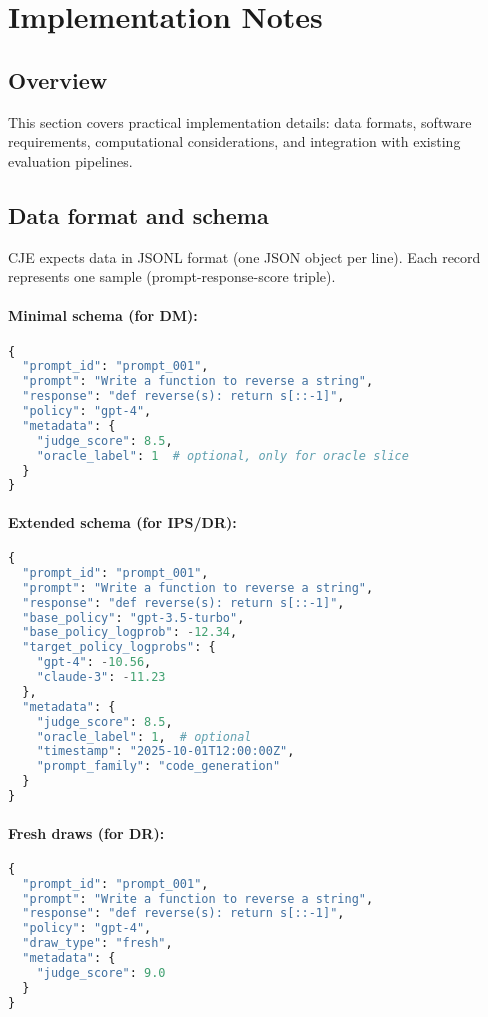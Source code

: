 \section{Implementation Notes}

\subsection{Overview}

This section covers practical implementation details: data formats, software requirements, computational considerations, and integration with existing evaluation pipelines.

\subsection{Data format and schema}

CJE expects data in JSONL format (one JSON object per line). Each record represents one sample (prompt-response-score triple).

\paragraph{Minimal schema (for DM):}
\begin{lstlisting}[language=Python,caption=DM Data Schema]
{
  "prompt_id": "prompt_001",
  "prompt": "Write a function to reverse a string",
  "response": "def reverse(s): return s[::-1]",
  "policy": "gpt-4",
  "metadata": {
    "judge_score": 8.5,
    "oracle_label": 1  # optional, only for oracle slice
  }
}
\end{lstlisting}

\paragraph{Extended schema (for IPS/DR):}
\begin{lstlisting}[language=Python,caption=Off-Policy Data Schema]
{
  "prompt_id": "prompt_001",
  "prompt": "Write a function to reverse a string",
  "response": "def reverse(s): return s[::-1]",
  "base_policy": "gpt-3.5-turbo",
  "base_policy_logprob": -12.34,
  "target_policy_logprobs": {
    "gpt-4": -10.56,
    "claude-3": -11.23
  },
  "metadata": {
    "judge_score": 8.5,
    "oracle_label": 1,  # optional
    "timestamp": "2025-10-01T12:00:00Z",
    "prompt_family": "code_generation"
  }
}
\end{lstlisting}

\paragraph{Fresh draws (for DR):}
\begin{lstlisting}[language=Python,caption=Fresh Draw Schema]
{
  "prompt_id": "prompt_001",
  "prompt": "Write a function to reverse a string",
  "response": "def reverse(s): return s[::-1]",
  "policy": "gpt-4",
  "draw_type": "fresh",
  "metadata": {
    "judge_score": 9.0
  }
}
\end{lstlisting}

